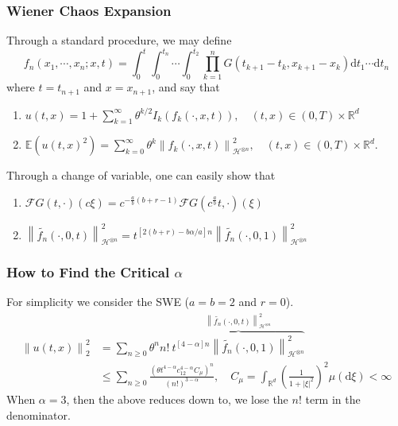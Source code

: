 \documentclass{beamer}%
\numberwithin{equation}{section}
\newcommand{\R}{\mathbb{R}}
\newcommand{\Norm}[1]{\left\|  #1   \right\|}
\newcommand{\ud}{\ensuremath{\mathrm{d} }}
\begin{document}
	\begin{frame}[t]
		\frametitle{Wiener Chaos Expansion}
		
		Through a standard procedure, we may define
		\[
		f_n(x_1, \cdots , x_n; x, t) = \int_0^t\int_0^{t_n}\cdots \int_0^{t_2} \prod_{k=1}^n G(t_{k+1}-t_k,x_{k+1}-x_k) \ud t_1 \cdots \ud t_n
		\]
		where $t=t_{n+1}$ and $x=x_{n+1}$, and say that
		\vspace{1em}
		\begin{enumerate}
			\setlength\itemsep{.8em}
			\item $u(t,x) = 1 + \sum_{k=1}^\infty \theta^{k/2} I_k(f_k(\cdot,x,t)), \quad (t,x)\in (0,T)\times \R^d$
			
			\item $\mathbb{E}(u(t,x)^2) = \sum_{k=0}^\infty \theta^{k} \Norm{f_k(\cdot,x,t)}^2_{\mathcal{H}^{\otimes n}}, \quad (t,x)\in (0,T)\times \R^d$.
		\end{enumerate}
		\vspace{1em}
		Through a change of variable, one can easily show that
		\vspace{1em}
		\begin{enumerate}
			\item $\mathcal{F}G(t,\cdot)(c\xi) = c^{-\frac{a}{b}(b+r -1)}\mathcal{F}G\left(c^{\frac{a}{b}}t,\cdot\right)( \xi)$
			\item $\Norm{\widetilde{f_n}(\cdot,0,t)}_{\mathcal{H}^{\otimes n}}^2 = t^{[2(b + r ) -b \alpha / a]n} \Norm{\widetilde{f_n}(\cdot,0,1)}_{\mathcal{H}^{\otimes n}}^2$
		\end{enumerate}
	\end{frame}
	
		\begin{frame}[t]
		\frametitle{How to Find the Critical $\alpha$}
		For simplicity we consider the SWE ($a=b=2$ and $r=0$).
		\begin{align*}
		\Norm{u(t,x)}_2^2 &= \sum_{n \ge 0} \theta^n n! \: \overbrace{t^{[4 - \alpha ]n}  \Norm{ \widetilde{f_n}(\cdot,0,1) }_{ \mathcal{H}^{\otimes n} }^2}^{\Norm{ \widetilde{f_n}(\cdot,0,t) }_{ \mathcal{H}^{\otimes n} }^2}
		\\&\le \sum_{n \ge 0} \frac{(\theta t^{4-\alpha}c_12^{4-\alpha} C_\mu)^n }{(n!)^{3-\alpha}}  , \quad C_\mu = \int_{\R^d} \left(\frac{1}{1+|\xi|^2}\right)^2 \mu(\ud \xi) < \infty
		\end{align*}
		When $\alpha = 3$, then the above reduces down to, we lose the $n!$ term in the denominator. 
	\end{frame}
	
\end{document}
